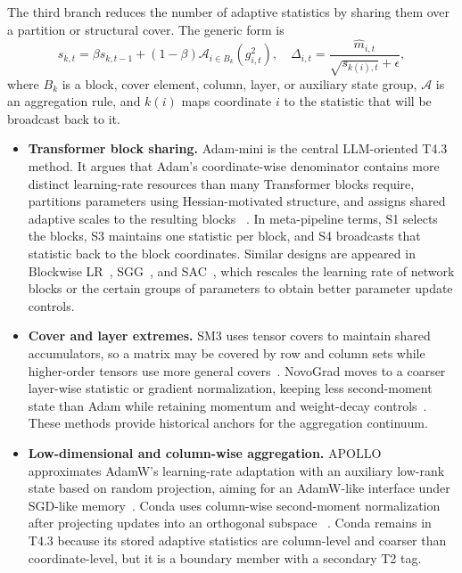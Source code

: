 The third branch reduces the number of adaptive statistics by sharing them
over a partition or structural cover.  The generic form is
\begin{equation}
  s_{k,t}
  =
  \beta s_{k,t-1}
  +(1-\beta)\mathcal{A}_{i\in B_k}(g_{i,t}^2),\quad
  \Delta_{i,t}
  =
  \frac{\widehat{m}_{i,t}}{\sqrt{s_{k(i),t}}+\epsilon},
  \label{eq:t4-shared-state-template}
\end{equation}
where $B_k$ is a block, cover element, column, layer, or auxiliary state
group, $\mathcal{A}$ is an aggregation rule, and $k(i)$ maps coordinate $i$
to the statistic that will be broadcast back to it.
\begin{itemize}
  \setlength{\itemsep}{2pt}
  \item \textbf{Transformer block sharing.}  Adam-mini is the central
  LLM-oriented T4.3 method.  It argues that Adam's coordinate-wise denominator
  contains more distinct learning-rate resources than many Transformer blocks
  require, partitions parameters using Hessian-motivated structure, and
  assigns shared adaptive scales to the resulting blocks
  ~\citep{zhang2025adam}.  In meta-pipeline terms, S1 selects the blocks,
  S3 maintains one statistic per block, and S4 broadcasts that statistic back
  to the block coordinates. Similar designs are appeared in Blockwise LR~\cite{wang2025sharpness}, SGG~\cite{li2025taming},
  and SAC~\cite{li2026sac}, which rescales the learning rate of network blocks
  or the certain groups of parameters to obtain better parameter update controls.
  \item \textbf{Cover and layer extremes.}  SM3 uses tensor covers to maintain
  shared accumulators, so a matrix may be covered by row and column sets while
  higher-order tensors use more general covers~\citep{anil2019memory}. NovoGrad
  moves to a coarser layer-wise statistic or gradient normalization, keeping
  less second-moment state than Adam while retaining momentum and weight-decay
  controls~\citep{ginsburg2019stochastic}.  These methods provide historical
  anchors for the aggregation continuum.
  \item \textbf{Low-dimensional and column-wise aggregation.}  APOLLO
  approximates AdamW's learning-rate adaptation with an auxiliary low-rank
  state based on random projection, aiming for an AdamW-like interface under
  SGD-like memory~\citep{zhu2025apollo}.  Conda uses column-wise second-moment
  normalization after projecting updates into an orthogonal subspace
  ~\citep{wang2025conda}.  Conda remains in T4.3 because its stored adaptive
  statistics are column-level and coarser than coordinate-level, but it is a
  boundary member with a secondary T2 tag.
\end{itemize}


